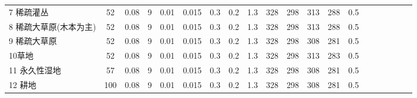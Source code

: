 \begin{sidewaystable}[]
\begin{tabular}{@{}lccccccccccccccccccc@{}}
        7 稀疏灌丛        & 52          & 0.08          & 9          & 0.01          & 0.015          & 0.3          & 0.2          & 1.3          & 328          & 298          & 313          & 288          & 0.5          \\
        8 稀疏大草原(木本为主) & 52          & 0.08          & 9          & 0.01          & 0.015          & 0.3          & 0.2          & 1.3          & 328          & 298          & 313          & 288          & 0.5          \\
        9 稀疏大草原       & 52          & 0.08          & 9          & 0.01          & 0.015          & 0.3          & 0.2          & 1.3          & 328          & 298          & 308          & 281          & 0.5          \\
        10草地          & 52          & 0.08          & 9          & 0.01          & 0.015          & 0.3          & 0.2          & 1.3          & 328          & 298          & 313          & 283          & 0.5          \\
        11 永久性湿地      & 57          & 0.08          & 9          & 0.01          & 0.015          & 0.3          & 0.2          & 1.3          & 328          & 298          & 308          & 281          & 0.5        \\ %
%    
        12 耕地         & 100 & 0.08 & 9 & 0.01 & 0.015 & 0.3 & 0.2 & 1.3 & 328 & 298 & 308 & 281 & 0.5 \\

\end{tabular}
\end{sidewaystable}
